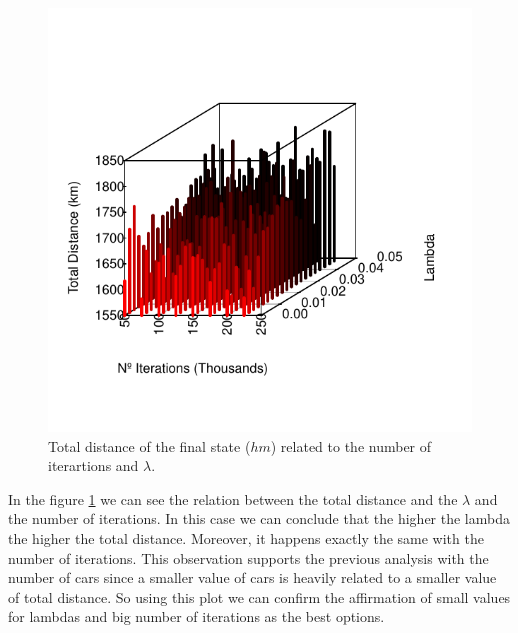 \documentclass[12]{article}
\begin{document}
       \begin{figure}
       \captionsetup{justification=centering}
       \centering
        \includegraphics[scale=0.45]{Results/data_B_3.pdf}
        \caption{Total distance of the final state ($hm$) related to the number of iterartions and $\lambda$.}
        \label{fig:data4}
    \end{figure}
      \vspace{1cm}
In the figure \ref{fig:data4} we can see the relation between the total distance and the $\lambda$ and the number of iterations. In this case we can conclude that the higher the lambda the higher the total distance. Moreover, it happens exactly the same with the number of iterations. This observation supports the previous analysis with the number of cars since a smaller value of cars is heavily related to a smaller value of total distance. So using this plot we can confirm the affirmation of small values for lambdas and big number of iterations as the best options. 
    
\end{document}
